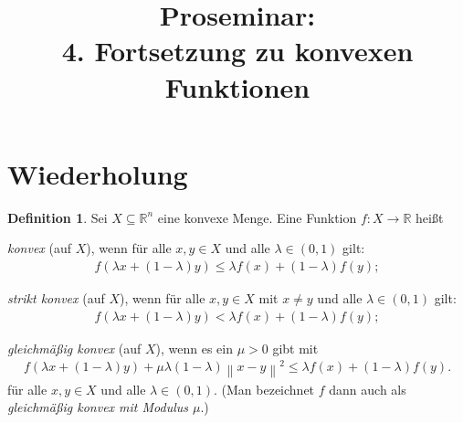 \documentclass[a4paper,reqno]{amsart}
\title[Fortsetzung zu konvexen Funktionen]{Proseminar:\\4. Fortsetzung zu konvexen Funktionen}
\theoremstyle{definition}
\newtheorem{definition}[theorem]{Definition}
\theoremstyle{remark}
\newcommand\norm[1]{\left\lVert#1\right\rVert}
\begin{document}
\maketitle



\section*{Wiederholung}
\setcounter{section}{3}\setcounter{theorem}{1}
\begin{definition}\label{def3.2}%
    Sei $X\subseteq\mathbb{R}^n$ eine konvexe Menge. Eine Funktion
    $f\colon X\to\mathbb{R}$ heißt
    \begin{compactenum}[(a)]
        \item \emph{konvex} (auf $X$), wenn für alle $x,y\in X$ und alle
            $\lambda\in(0,1)$ gilt:
            \begin{align*}
                f(\lambda x+(1-\lambda)y)\leq\lambda f(x) + (1-\lambda)f(y);
            \end{align*}
        \item \emph{strikt konvex} (auf $X$), wenn für alle $x,y\in X$ mit
            $x\neq y$ und alle $\lambda\in(0,1)$ gilt:
            \begin{align*}
                f(\lambda x+(1-\lambda)y)<\lambda f(x) + (1-\lambda)f(y);
            \end{align*}
        \item \emph{gleichmäßig konvex} (auf $X$), wenn es ein $\mu>0$
            gibt mit
            \begin{align*}
                f(\lambda x+(1-\lambda)y) + \mu\lambda(1-\lambda)\norm{x-y}^2\leq\lambda f(x) + (1-\lambda)f(y).
            \end{align*}
            für alle $x,y\in X$ und alle $\lambda\in(0,1)$.
            (Man bezeichnet $f$ dann auch als \emph{gleichmäßig konvex mit
            Modulus $\mu$}.)
        \end{compactenum}
\end{definition}
\end{document}
